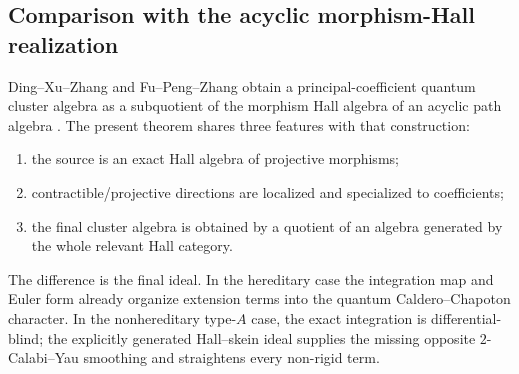 \subsection{Comparison with the acyclic morphism-Hall realization}

Ding--Xu--Zhang and Fu--Peng--Zhang obtain a principal-coefficient quantum
cluster algebra as a subquotient of the morphism Hall algebra of an acyclic
path algebra \cite{DingXuZhang,FuPengZhang}.  The present theorem shares three
features with that construction:
\begin{enumerate}[label=(\alph*),leftmargin=2.3em]
\item the source is an exact Hall algebra of projective morphisms;
\item contractible/projective directions are localized and specialized to
      coefficients;
\item the final cluster algebra is obtained by a quotient of an algebra
      generated by the whole relevant Hall category.
\end{enumerate}
The difference is the final ideal.  In the hereditary case the integration
map and Euler form already organize extension terms into the quantum
Caldero--Chapoton character.  In the nonhereditary type-$A$ case, the exact
integration is differential-blind; the explicitly generated Hall--skein ideal
supplies the missing opposite $2$-Calabi--Yau smoothing and straightens every
non-rigid term.
